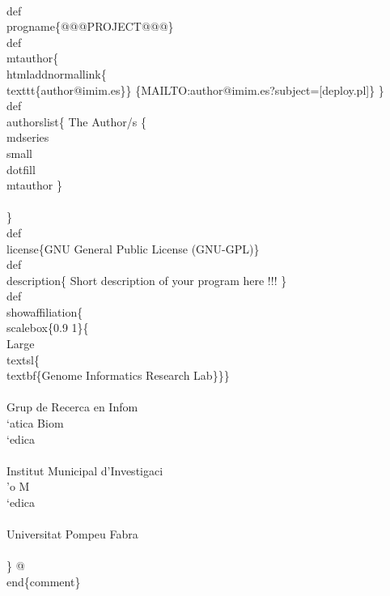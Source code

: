 \documentclass[11pt]{article}
\def\nwendcode{\endtrivlist \endgroup} %
\let\nwdocspar=\par                    %
\begin{document}
%
\\def\\progname\{@@@PROJECT@@@\}
\\def\\mtauthor\{
 \\htmladdnormallink\{\\texttt\{author@imim.es\}\}
                   \{MAILTO:author@imim.es?subject=[deploy.pl]\}
 \} %
\\def\\authorslist\{
 The Author/s \{\\mdseries\\small\\dotfill \\mtauthor \} \\\\
 \} %
\\def\\license\{GNU General Public License (GNU-GPL)\}
\\def\\description\{
Short description of your program here !!!
 \} %
\\def\\showaffiliation\{
\\scalebox\{0.9 1\}\{\\Large\\textsl\{\\textbf\{Genome Informatics Research Lab\}\}\}\\\\
Grup de Recerca en Infom\\`atica Biom\\`edica\\\\
Institut Municipal d'Investigaci\\'o M\\`edica\\\\
Universitat Pompeu Fabra\\\\[2ex]
 \} %
%
@
\\end\{comment\}
\nwendcode{}\nwdocspar
\end{document}
